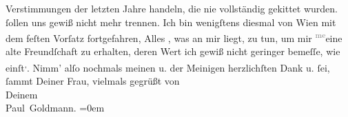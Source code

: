 \begin{ledgroupsized}[t]{13cm}
{{{                  Verstimmungen der letzten Jahre handeln, die nie vollständig gekittet
                  wurden.}}}\label{K_L03254-3h} ſollen uns gewiß nicht mehr trennen. Ich bin wenigſtens diesmal von
                  Wien mit dem feſten Vorſatz fortgefahren, Alles
                  , was an mir liegt, zu tun, um mir \substVorne{}\textsuperscript{\textcolor{gray}{me}}\substDazwischen{}eine\substHinten{} alte Freundſchaft zu erhalten, deren Wert ich gewiß nicht geringer bemeſſe,
               wie einſt\substVorne{}\textsuperscript{,}\substDazwischen{}.\substHinten{}\pend
           \pstart
           Nimm’ alſo nochmals meinen u. der Meinigen herzlichſten Dank u. ſei, ſammt
               Deiner Frau, vielmals gegrüßt
               von {\\[\baselineskip]}Deinem {\\[\baselineskip]}\spacefill\mbox{Paul Goldmann.}\pend
           \leftskip=0em{}
         
         \endnumbering{}\end{ledgroupsized}  \newcommand{\dateiname}{L03254}\newcommand{\titel}{Paul Goldmann an Arthur Schnitzler, 7. 7. 1907}\newcommand{\editorInnen}{Martin Anton Müller und Laura Untner}
      